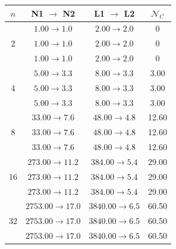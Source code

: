 \begin{table}[h!]
    \centering
    \begin{tabular}{c|c|c|c}
        \toprule
        $n$ & N1 $\rightarrow$ N2 & L1 $\rightarrow$ L2 & $\mathcal{N}_C$ \\
        \midrule

        \multirow{3}{*}{2}
            & $1.00 \rightarrow 1.0$ & $2.00 \rightarrow 2.0$ & 0 \\
            & $1.00 \rightarrow 1.0$ & $2.00 \rightarrow 2.0$ & 0 \\
            & $1.00 \rightarrow 1.0$ & $2.00 \rightarrow 2.0$ & 0 \\

        \cmidrule(lr){1-4}

        \multirow{3}{*}{4}
            & $5.00 \rightarrow 3.3$ & $8.00 \rightarrow 3.3$ & 3.00 \\
            & $5.00 \rightarrow 3.3$ & $8.00 \rightarrow 3.3$ & 3.00 \\
            & $5.00 \rightarrow 3.3$ & $8.00 \rightarrow 3.3$ & 3.00 \\

        \cmidrule(lr){1-4}

        \multirow{3}{*}{8}
            & $33.00 \rightarrow 7.6$ & $48.00 \rightarrow 4.8$ & 12.60 \\
            & $33.00 \rightarrow 7.6$ & $48.00 \rightarrow 4.8$ & 12.60 \\
            & $33.00 \rightarrow 7.6$ & $48.00 \rightarrow 4.8$ & 12.60 \\

        \cmidrule(lr){1-4}

        \multirow{3}{*}{16}
            & $273.00 \rightarrow 11.2$ & $384.00 \rightarrow 5.4$ & 29.00 \\
            & $273.00 \rightarrow 11.2$ & $384.00 \rightarrow 5.4$ & 29.00 \\
            & $273.00 \rightarrow 11.2$ & $384.00 \rightarrow 5.4$ & 29.00 \\

        \cmidrule(lr){1-4}

        \multirow{3}{*}{32}
            & $2753.00 \rightarrow 17.0$ & $3840.00 \rightarrow 6.5$ & 60.50 \\
            & $2753.00 \rightarrow 17.0$ & $3840.00 \rightarrow 6.5$ & 60.50 \\
            & $2753.00 \rightarrow 17.0$ & $3840.00 \rightarrow 6.5$ & 60.50 \\


\end{tabular}
\end{table}
